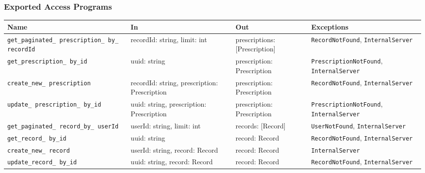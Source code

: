 \documentclass[12pt, titlepage]{article}
\begin{document}
\subsubsection{Exported Access Programs}
\begin{center}
\small  %
\renewcommand{\arraystretch}{1.5}  %
\begin{tabular}{|p{4.5cm}|p{2.5cm}|p{2.5cm}|p{4cm}|}
    \hline
    \textbf{Name} & \textbf{In} & \textbf{Out} & \textbf{Exceptions} \\
    \hline 
    \texttt{get\_paginated\_ prescription\_ by\_ recordId} & recordId: string, \newline limit: int & prescriptions: [Prescription] & \texttt{RecordNotFound}, \newline \texttt{InternalServer} \\
    \hline
    \texttt{get\_prescription\_ by\_id} & uuid: string & prescription: Prescription & \texttt{PrescriptionNotFound}, \newline \texttt{InternalServer} \\
    \hline
    \texttt{create\_new\_ prescription} & recordId: string, \newline prescription: Prescription & prescription: Prescription & \texttt{RecordNotFound}, \newline \texttt{InternalServer} \\
    \hline
    \texttt{update\_ prescription\_ by\_id} & uuid: string, \newline prescription: Prescription & prescription: Prescription & \texttt{PrescriptionNotFound}, \newline \texttt{InternalServer} \\
    \hline
    \texttt{get\_paginated\_ record\_by\_ userId} & userId: string, \newline limit: int & records: [Record] & \texttt{UserNotFound}, \newline \texttt{InternalServer} \\
    \hline
    \texttt{get\_record\_ by\_id} & uuid: string & record: Record & \texttt{RecordNotFound}, \newline \texttt{InternalServer} \\
    \hline
    \texttt{create\_new\_ record} & userId: string, \newline record: Record & record: Record & \texttt{InternalServer} \\
    \hline
    \texttt{update\_record\_ by\_id} & uuid: string, \newline record: Record & record: Record & \texttt{RecordNotFound}, \newline \texttt{InternalServer} \\
    \hline
\end{tabular}
\end{center}
\end{document}
